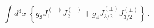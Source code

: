 \begin{equation}
 \label{marginal}
 \int d^3x\ \left\{ g_3 J_1^{(+)}J_2^{(-)}+g_4 \bar{J}_{3/2}^{(\pm)}J_{3/2}^{(\pm)}\right\}\,.
 \end{equation}

